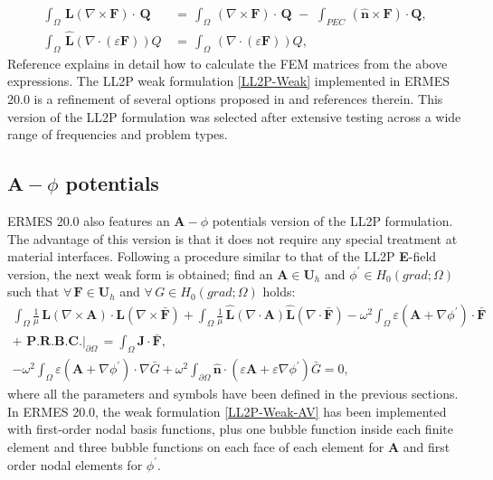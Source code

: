 \begin{equation}
	\begin{aligned}
	    \int_{\Omega}\,\mathbf{L}\left(\nabla\times\mathbf{F}\right)\cdot\,\mathbf{Q}\, &= \,\int_{\Omega}\,\left(\nabla\times\mathbf{F}\right)\cdot\,\mathbf{Q}\,\, - \, \,\int_{PEC}\,(\mathbf{\hat{n}}\times\mathbf{F})\cdot\mathbf{Q}, 
	    \\
	    \int_{\Omega}\,\mathbf{\hat{L}}\left(\nabla\cdot\left(\varepsilon\mathbf{F}\right)\right) Q\, &= \,\int_{\Omega}\,\left(\nabla\cdot\left(\varepsilon\mathbf{F}\right)\right) Q,	
    \end{aligned}
\end{equation}
Reference \cite{L2P-BE-P} explains in detail how to calculate the FEM matrices from the above expressions. The LL2P weak formulation \eqref{LL2P-Weak} implemented in ERMES 20.0 is a refinement of several options proposed in \cite{L2P-BE, L2P-BE-P} and references therein. This version of the LL2P formulation was selected after extensive testing across a wide range of frequencies and problem types.

\subsection{$\textbf{A}-\phi$ potentials}

ERMES 20.0 also features an $\textbf{A}-\phi$ potentials version of the LL2P formulation. The advantage of this version is that it does not require any special treatment at material interfaces. Following a procedure similar to that of the LL2P \textbf{E}-field version, the next weak form is obtained; find an $\mathbf{A} \in \mathbf{U}_{h}$ and $\phi^{'} \in H_{0}(grad;\Omega)$ such that $\forall\,\mathbf{F} \in \mathbf{U}_{h}$ and $\forall\,G \in H_{0}(grad;\Omega)$ holds:
\begin{equation}\label{LL2P-Weak-AV}
	\begin{aligned}
		\int_{\Omega}\frac{1}{\mu}\,\mathbf{L}\left(\nabla\times\mathbf{A}\right)\cdot\mathbf{L}\left(\nabla\times\mathbf{\bar{F}}\right) + \int_{\Omega}\frac{1}{\mu}\,\mathbf{\hat{L}}\left(\nabla\cdot\mathbf{A}\right)\mathbf{\hat{L}}\left(\nabla\cdot\mathbf{\bar{F}}\right)- \omega^{2}\int_{\Omega}\varepsilon\left(\mathbf{A} + \nabla\phi^{'}\right)\cdot\mathbf{\bar{F}}\,\,&
		\\ 
		+\,\,\textbf{P.R.B.C.}|_{\partial\Omega}\, = \int_{\Omega}\mathbf{J}\cdot\mathbf{\bar{F}},\,&
		\\
		-\omega^{2}\int_{\Omega}\varepsilon\left(\mathbf{A} + \nabla\phi^{'}\right)\cdot\nabla\bar{G} + \omega^{2}\int_{\partial\Omega}\mathbf{\hat{n}}\cdot\left(\varepsilon\mathbf{A} + \varepsilon\nabla\phi^{'}\right)\bar{G} = 0,\,&	
	\end{aligned}
\end{equation}
where all the parameters and symbols have been defined in the previous sections. In ERMES 20.0, the weak formulation \ref{LL2P-Weak-AV} has been implemented with first-order nodal basis functions, plus one bubble function inside each finite element and three bubble functions on each face of each element for \textbf{A} and first order nodal elements for $\phi^{'}$.  

